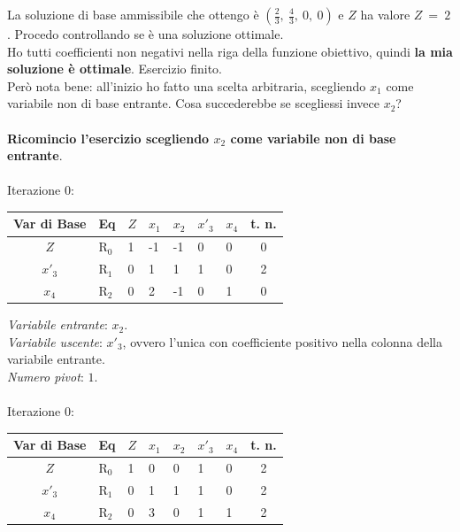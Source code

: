 \documentclass[12pt, a4paper, openany]{book}
\begin{document}
\noindent La soluzione di base ammissibile che ottengo è $(\frac{2}{3},\ \frac{4}{3},\ 0,\ 0)$ e $Z$ ha valore $Z\ =\ 2$. Procedo controllando se è una soluzione ottimale.\\
\noindent Ho tutti coefficienti non negativi nella riga della funzione obiettivo, quindi \textbf{la mia soluzione è ottimale}. Esercizio finito.\\
\noindent Però nota bene: all'inizio ho fatto una scelta arbitraria, scegliendo $x_1$ come variabile non di base entrante. Cosa succederebbe se scegliessi invece $x_2$?\\
\\
\noindent \textbf{Ricomincio l'esercizio scegliendo $x_2$ come variabile non di base entrante}.\\
\\
\noindent Iterazione 0:
\begin{center}
    \begin{tabularx}{0.75\textwidth}{ |c|X|X|X|X|X|X|c| } 
        \hline
        Var di Base & Eq & $Z$ & $x_1$ & $x_2$ & $x'_3$ & $x_4$ & t. n.\\
        \hline 
        \hline 
        $Z$ & R$_0$ & 1 & -1 & -1 & 0 & 0 & 0\\
        \hline 
        $x'_3$ & R$_1$ & 0 & 1 & 1 & 1 & 0 & 2\\
        \hline 
        $x_4$ & R$_2$ & 0 & 2 & -1 & 0 & 1 & 0\\
        \hline
    \end{tabularx}
\end{center}
\noindent \textit{Variabile entrante}: $x_2$.\\
\noindent \textit{Variabile uscente}: $x'_3$, ovvero l'unica con coefficiente positivo nella colonna della variabile entrante.\\
\noindent \textit{Numero pivot}: $1$.\\
\\
\noindent Iterazione 0:
\begin{center}
    \begin{tabularx}{0.75\textwidth}{ |c|X|X|X|X|X|X|c| } 
        \hline
        Var di Base & Eq & $Z$ & $x_1$ & $x_2$ & $x'_3$ & $x_4$ & t. n.\\
        \hline 
        \hline 
        $Z$ & R$_0$ & 1 & 0 & 0 & 1 & 0 & 2\\
        \hline 
        $x'_3$ & R$_1$ & 0 & 1 & 1 & 1 & 0 & 2\\
        \hline 
        $x_4$ & R$_2$ & 0 & 3 & 0 & 1 & 1 & 2\\
        \hline
    \end{tabularx}
\end{center}
\end{document}
